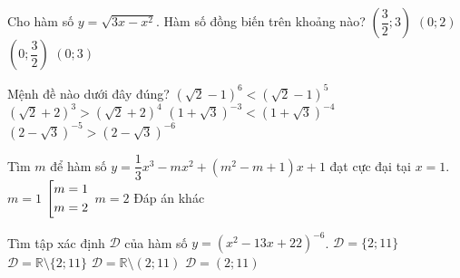 \begin{ex}%
	Cho hàm số $y = \sqrt{3x -x^2}$. Hàm số đồng biến trên khoảng nào?
\choice
{$\left( \dfrac{3}{2} ; 3 \right)$}
{$(0;2)$}
{\True $\left( 0; \dfrac{3}{2} \right) $}
{ $(0;3)$}
\end{ex} 

\begin{ex}%
	Mệnh đề nào dưới đây đúng?
	\choice
	{\True $\left( \sqrt{2} - 1 \right)^6 < \left( \sqrt{2} - 1 \right)^5$}
	{$\left( \sqrt{2} + 2 \right)^3 > \left( \sqrt{2} + 2 \right)^4$}
	{$\left( 1 + \sqrt{3} \right)^{-3} < \left( 1 + \sqrt{3} \right)^{-4}$}
	{$\left( 2 - \sqrt{3} \right)^{-5} > \left( 2 - \sqrt{3} \right)^{-6}$}
\end{ex}

\begin{ex}%
	Tìm $m$ để hàm số $y = \dfrac{1}{3} x^3 - mx^2 + (m^2 - m +1)x + 1$ đạt cực đại tại $x = 1$.
	\choice
	{$m = 1$} 
	{$\left[\begin{aligned}&m = 1\\ & m=2\end{aligned}\right.$}
	{\True $m=2$}
	{Đáp án khác}
\end{ex}

\begin{ex}%
	Tìm tập xác định $\mathscr{D}$ của hàm số $y = (x^2 -13x +22)^{-6}$.
	\choice
	{$\mathscr{D} = \{2 ; 11\}$}
	{\True $\mathscr{D} = \mathbb{R} \setminus \{2; 11\}$}
	{$\mathscr{D} = \mathbb{R} \setminus (2; 11)$}
	{$\mathscr{D} = (2;11)$}
\end{ex}


